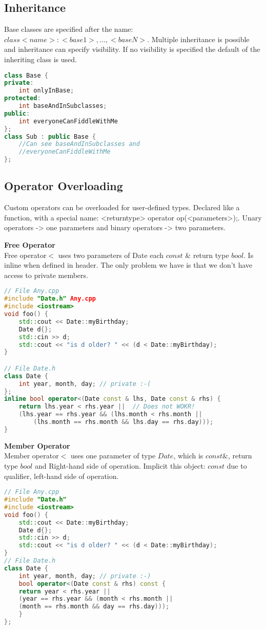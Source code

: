 \subsection{Inheritance}
 Base classes are specified after the name: $class <name> : <base1>, ... , <baseN>$. Multiple inheritance is possible and inheritance can specify visibility. If no visibility is specified the default of the inheriting class is used.

\begin{lstlisting}[language=C++]
class Base { 
private:
	int onlyInBase; 
protected:
	int baseAndInSubclasses;
public:
	int everyoneCanFiddleWithMe 
};
class Sub : public Base {
	//Can see baseAndInSubclasses and
	//everyoneCanFiddleWithMe 
};	
\end{lstlisting}

\subsection{Operator Overloading}
Custom operators can be overloaded for user-defined types. Declared like a function, with a special name: <returntype> operator op(<parameters>);. 
Unary operators -> one parameters and binary operators -> two parameters.

\textbf{Free Operator} \\
Free operator$<$ uses two parameters of Date each $const$ \& return type $bool$. Is inline when defined in header. The only problem we have is that we don't have access to private members.
\begin{lstlisting}[language=C++]
// File Any.cpp
#include "Date.h" Any.cpp
#include <iostream>
void foo() {
	std::cout << Date::myBirthday;
	Date d{};
	std::cin >> d;
	std::cout << "is d older? " << (d < Date::myBirthday); 
}

// File Date.h
class Date {
	int year, month, day; // private :-( 
};
inline bool operator<(Date const & lhs, Date const & rhs) {
	return lhs.year < rhs.year ||  // Does not WOKR!
	(lhs.year == rhs.year && (lhs.month < rhs.month ||
		(lhs.month == rhs.month && lhs.day == rhs.day)));
}
\end{lstlisting}

\textbf{Member Operator} \\
Member operator$<$ uses one parameter of type $Date$, which is $const \&$, return type $bool$ and Right-hand side of operation. Implicit this object: $const$ due to qualifier, left-hand side of operation.
\begin{lstlisting}[language=C++]
// File Any.cpp
#include "Date.h" 
#include <iostream>
void foo() {
	std::cout << Date::myBirthday;
	Date d{};
	std::cin >> d;
	std::cout << "is d older? " << (d < Date::myBirthday); 
}
// File Date.h
class Date {
	int year, month, day; // private :-)
	bool operator<(Date const & rhs) const {
	return year < rhs.year ||
	(year == rhs.year && (month < rhs.month ||
	(month == rhs.month && day == rhs.day)));
	} 
};
\end{lstlisting}


\break







